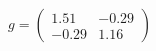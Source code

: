\documentclass[preview]{standalone}
\begin{document}
\begin{align*}
g = \begin{pmatrix} 1.51 & -0.29 \\ -0.29 & 1.16 \end{pmatrix}
\end{align*}
\end{document}
